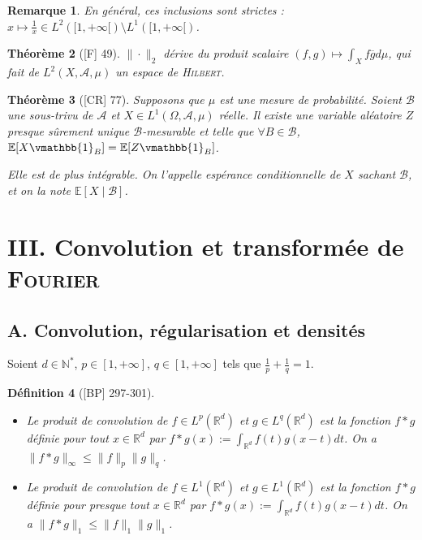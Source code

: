 \documentclass[10pt, a4paper, parskip=full, twoside, twocolumn]{report}
\newtheorem{definition}{Définition}
\newtheorem{theorem}[definition]{Théorème}
\newtheorem{remark}[definition]{Remarque}
\newcommand{\IN}{\mathbb{N}}
\newcommand{\IE}{\mathbb{E}}
\newcommand{\IR}{\mathbb{R}}
\newcommand{\B}{\mathcal{B}}
\newcommand{\A}{\mathscr{A}}
\begin{document}
\begin{remark}
	En général, ces inclusions sont strictes : $x\mapsto\frac{1}{x}\in L^2([1,+\infty[)\setminus L^1([1,+\infty[)$.
\end{remark}

\begin{theorem}[\textnormal{[F] 49}]
	$\|\cdot\|_2$ dérive du produit scalaire $(f,g)\mapsto \int_X f\overline{g}d\mu$, qui fait de $L^2(X,\A,\mu)$ un espace de \textsc{Hilbert}.
\end{theorem}

\begin{tcolorbox}[
    breakable, %
    colback=developpement, %
    colframe=gray!0!black, %
    boxrule=0pt, %
    arc=1mm, %
	boxsep=0pt,
	left=0pt, right=0pt, top=0pt, bottom=0pt
]
\begin{theorem}[\textnormal{[CR] 77}]
	\label{234dev1}
	Supposons que $\mu$ est une mesure de probabilité. Soient $\B$ une sous-trivu de $\A$ et $X\in L^1(\Omega,\A,\mu)$ réelle.
	Il existe une variable aléatoire $Z$ presque sûrement unique $\B$-mesurable et telle que $\forall B\in \B$, $\IE[X\vmathbb{1}_B] = \IE[Z\vmathbb{1}_{B}]$.

	Elle est de plus intégrable. On l'appelle \emph{espérance conditionnelle de $X$ sachant $\B$}, et on la note $\IE[X\mid \B]$.
\end{theorem}
\end{tcolorbox}

\section*{III. Convolution et transformée de \textsc{Fourier}}
\subsection*{A. Convolution, régularisation et densités}
\textcolor{paragraphtext}{Soient $d\in\IN^*$, $p\in[1,+\infty]$, $q\in[1,+\infty]$ tels que $\frac{1}{p} + \frac{1}{q} = 1$.}

\begin{definition}[\textnormal{[BP] 297-301}]
	\begin{itemize}
		\item Le \emph{produit de convolution de $f\in L^p(\IR^d)$ et $g\in L^q(\IR^d)$} est la fonction $f*g$ définie pour tout $x\in \IR^d$ par $f*g(x) := \int_{\IR^d} f(t)g(x-t)dt$. On a $\|f*g\|_{\infty} \leq \|f\|_p\|g\|_q$.
		\item Le \emph{produit de convolution de $f\in L^1(\IR^d)$ et $g\in L^1(\IR^d)$} est la fonction $f*g$ définie pour \emph{presque} tout $x\in \IR^d$ par $f*g(x) := \int_{\IR^d} f(t)g(x-t)dt$. On a $\|f*g\|_1\leq \|f\|_1\|g\|_1$.
	\end{itemize}
\end{definition}
\end{document}
